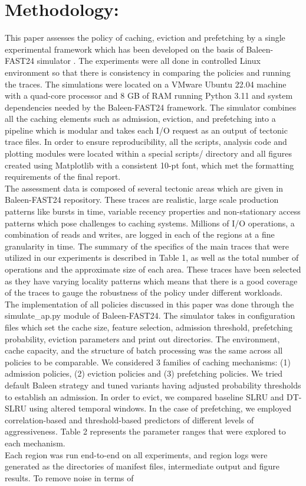 \documentclass[sigconf]{acmart}
\begin{document}
{\clearpage
\section{Methodology:}
\large This paper assesses the policy of caching, eviction and prefetching by a single experimental framework which has been developed on the basis of Baleen-FAST24 simulator \cite{baleen_artifact}. The experiments were all done in controlled Linux environment so that there is consistency in comparing the policies and running the traces. The simulations were located on a VMware Ubuntu 22.04 machine with a quad-core processor and 8 GB of RAM running Python 3.11 and system dependencies needed by the Baleen-FAST24 framework. The simulator combines all the caching elements such as admission, eviction, and prefetching into a pipeline which is modular and takes each I/O request as an output of tectonic trace files. In order to ensure reproducibility, all the scripts, analysis code and plotting modules were located within a special scripts/ directory and all figures created using Matplotlib with a consistent 10-pt font, which met the formatting requirements of the final report.\\\indent The assessment data is composed of several tectonic areas which are given in Baleen-FAST24 repository. These traces are realistic, large scale production patterns like bursts in time, variable recency properties and non-stationary access patterns which pose challenges to caching systems. Millions of I/O operations, a combination of reads and writes, are logged in each of the regions at a fine granularity in time. The summary of the specifics of the main traces that were utilized in our experiments is described in Table 1, as well as the total number of operations and the approximate size of each area. These traces have been selected as they have varying locality patterns which means that there is a good coverage of the traces to gauge the robustness of the policy under different workloads.\\\indent The implementation of all policies discussed in this paper was done through the simulate\_ap.py module of Baleen-FAST24. The simulator takes in configuration files which set the cache size, feature selection, admission threshold, prefetching probability, eviction parameters and print out directories. The environment, cache capacity, and the structure of batch processing was the same across all policies to be comparable. We considered 3 families of caching mechanisms: (1) admission policies, (2) eviction policies and (3) prefetching policies. We tried default Baleen strategy and tuned variants having adjusted probability thresholds to establish an admission. In order to evict, we compared baseline SLRU and DT-SLRU using altered temporal windows. In the case of prefetching, we employed correlation-based and threshold-based predictors of different levels of aggressiveness. Table 2 represents the parameter ranges that were explored to each mechanism.\\\indent Each region was run end-to-end on all experiments, and region logs were generated as the directories of manifest files, intermediate output and figure results. To remove noise in terms of }
\end{document}
